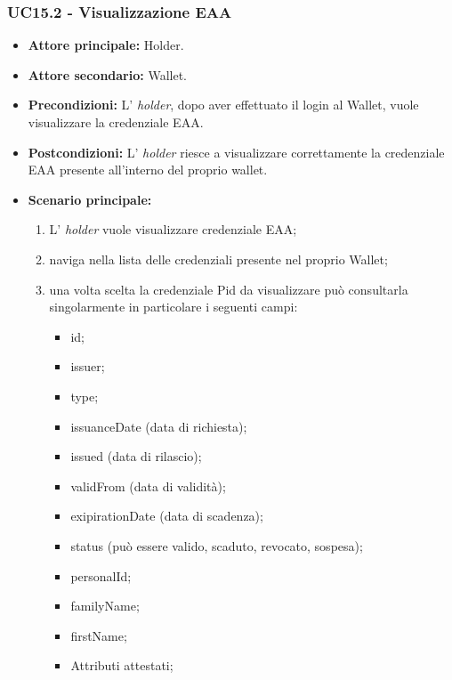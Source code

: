 \subsubsection{UC15.2 - Visualizzazione EAA}
\begin{itemize}
\item \textbf{Attore principale:} Holder.
\item \textbf{Attore secondario:} Wallet.
\item \textbf{Precondizioni:} L’ \textit{holder}, dopo aver effettuato il login al Wallet,  vuole visualizzare la credenziale EAA.
\item \textbf{Postcondizioni:} L’ \textit{holder} riesce a visualizzare correttamente la credenziale EAA presente all'interno del proprio wallet.
\item \textbf{Scenario principale:} 
    \begin{enumerate}
        \item L' \textit{holder} vuole visualizzare credenziale EAA; 
        \item naviga nella lista delle credenziali presente nel proprio Wallet;
        \item una volta scelta la credenziale Pid da visualizzare può consultarla singolarmente in particolare i seguenti campi:
        \begin{itemize}
            \item id;
            \item issuer;
            \item type;
            \item issuanceDate (data di richiesta);
            \item issued (data di rilascio);
            \item validFrom (data di validità);
            \item exipirationDate (data di scadenza);
            \item status (può essere valido, scaduto, revocato, sospesa);
            \item personalId;
            \item familyName;
            \item firstName;
            \item Attributi attestati;
        \end{itemize}
    \end{enumerate}
\end{itemize}


